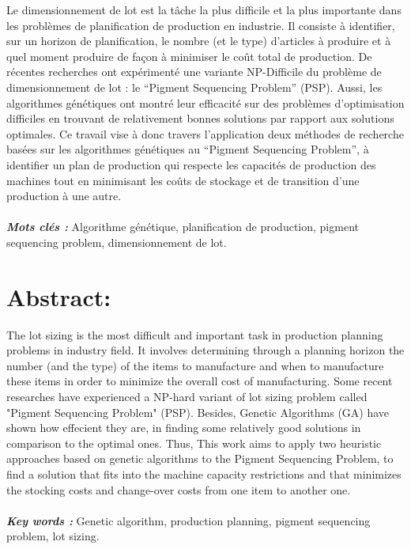 \documentclass[12pt,a4paper]{article}
\begin{document}
	Le dimensionnement de lot est la tâche la plus difficile et la plus importante dans les problèmes de planification de production en industrie. Il consiste à identifier, sur un horizon de planification, le nombre (et le type) d’articles à produire et à quel moment produire de façon à minimiser le coût total de production. De récentes recherches ont expérimenté une variante NP-Difficile du problème de dimensionnement de lot : le “Pigment Sequencing Problem” (PSP). Aussi, les algorithmes génétiques ont montré leur efficacité sur des problèmes d’optimisation difficiles en trouvant de relativement bonnes solutions par rapport aux solutions optimales. Ce travail vise à donc travers l'application deux méthodes de recherche basées sur les algorithmes génétiques au “Pigment Sequencing Problem”, à identifier un plan de production qui respecte les capacités de production des machines tout en minimisant les coûts de stockage et de transition d’une production à une autre. \\
	\\
	\hspace*{.5cm}\textsl{\textbf{Mots clés :}} Algorithme génétique, planification de production, pigment sequencing problem, dimensionnement de lot.
	
	\newpage %
	
	\section*{Abstract:}
	
	\vspace{1cm}
	
	The lot sizing is the most difficult and important task in production planning problems in industry field. It involves determining through a planning horizon the number (and the type) of the items to manufacture and when to manufacture these items in order to minimize the overall cost of manufacturing. Some recent researches have experienced a NP-hard variant of lot sizing problem called "Pigment Sequencing Problem" (PSP). Besides, Genetic Algorithms (GA) have shown how effecient they are, in finding some relatively good solutions in comparison to the optimal ones. Thus, This work aims to apply two heuristic approaches based on genetic algorithms to the Pigment Sequencing Problem, to find a solution that fits into the machine capacity restrictions and that minimizes the stocking costs and change-over costs from one item to another one.\\
	\\
	\hspace*{.5cm}\textsl{\textbf{Key words :}} Genetic algorithm, production planning, pigment sequencing problem, lot sizing.
	
\end{document}
